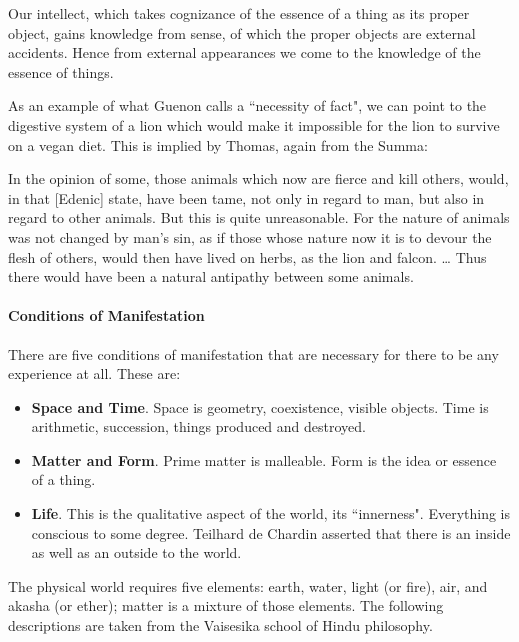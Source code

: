 \begin{quotex}
Our intellect, which takes cognizance of the essence of a thing as its proper object, gains knowledge from sense, of which the proper objects are external accidents. Hence from external appearances we come to the knowledge of the essence of things. 

\end{quotex}
As an example of what Guenon calls a ``necessity of fact", we can point to the digestive system of a lion which would make it impossible for the lion to survive on a vegan diet. This is implied by Thomas, again from the Summa:

\begin{quotex}
In the opinion of some, those animals which now are fierce and kill others, would, in that [Edenic] state, have been tame, not only in regard to man, but also in regard to other animals. But this is quite unreasonable. For the nature of animals was not changed by man's sin, as if those whose nature now it is to devour the flesh of others, would then have lived on herbs, as the lion and falcon. … Thus there would have been a natural antipathy between some animals. 

\end{quotex}
\paragraph{Conditions of Manifestation}
There are five conditions of manifestation that are necessary for there to be any experience at all. These are:

\begin{itemize}
\item \textbf{Space and Time}. Space is geometry, coexistence, visible objects. Time is arithmetic, succession, things produced and destroyed. 
\item \textbf{Matter and Form}. Prime matter is malleable. Form is the idea or essence of a thing. 
\item \textbf{Life}. This is the qualitative aspect of the world, its ``innerness". Everything is conscious to some degree. Teilhard de Chardin asserted that there is an inside as well as an outside to the world. 
\end{itemize}
The physical world requires five elements: earth, water, light (or fire), air, and akasha (or ether); matter is a mixture of those elements. The following descriptions are taken from the Vaisesika school of Hindu philosophy.

